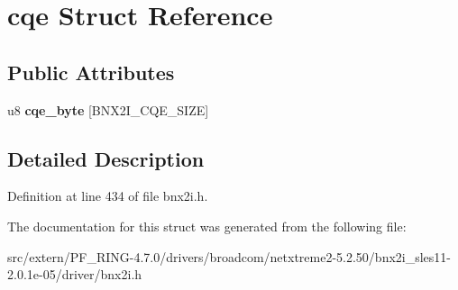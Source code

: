 \hypertarget{structcqe}{
\section{cqe Struct Reference}
\label{structcqe}
}
\subsection*{Public Attributes}
\begin{DoxyCompactItemize}
\item 
\hypertarget{structcqe_a5896259f724960dfeb45f89ca75022cc}{
u8 {\bfseries cqe\_\-byte} \mbox{[}BNX2I\_\-CQE\_\-SIZE\mbox{]}}
\label{structcqe_a5896259f724960dfeb45f89ca75022cc}

\end{DoxyCompactItemize}


\subsection{Detailed Description}


Definition at line 434 of file bnx2i.h.



The documentation for this struct was generated from the following file:\begin{DoxyCompactItemize}
\item 
src/extern/PF\_\-RING-\/4.7.0/drivers/broadcom/netxtreme2-\/5.2.50/bnx2i\_\-sles11-\/2.0.1e-\/05/driver/bnx2i.h\end{DoxyCompactItemize}
